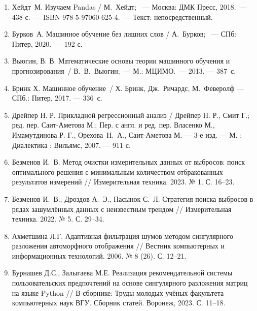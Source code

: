 \documentclass[a4paper,12pt]{article}
\begin{document}
\begin{enumerate}
	\item Хейдт М. Изучаем Pandas / М. Хейдт;  — Москва: ДМК Пресс, 2018. — 438 с. — ISBN 978-5-97060-625-4. — Текст: непосредственный.
	\item Бурков А. Машинное обучение без лишних слов / А. Бурков;  — СПб: Питер, 2020. — 192 с.
	\item Вьюгин, В. В. Математические основы теории машинного обучения и прогнозирования / В. В. Вьюгин; — М.: МЦИМО. — 2013. — 387~с.
	\item Бринк Х. Машинное обучение / Х. Бринк, Дж. Ричардс, М. Феверолф  — СПб.: Питер, 2017. — 336~с.
	\item Дрейпер Н. Р. Прикладной регрессионный анализ / Дрейпер Н. Р., Смит Г.; ред. пер. Саит-Аметова М.; Пер. с англ. и ред. пер. Власенко М., Имамутдинова Р. Г., Орехова Н. А., Саит-Аметова М. --- 3-е изд. --- М. : Диалектика : Вильямс, 2007. --- 911 с.
	\item Безменов И. В. Метод очистки измерительных данных от выбросов: поиск оптимального решения с минимальным количеством отбракованных результатов измерений // Измерительная техника. 2023. № 1. С. 16--23. 
	\item Безменов И. В., Дроздов А. Э., Пасынок С. Л. Стратегия поиска выбросов в рядах зашумлённых данных с неизвестным трендом // Измерительная техника. 2022. № 5. С. 29--34.
	\item Ахметшина Л.Г. Адаптивная фильтрация шумов методом сингулярного разложения автоморфного отображения // Вестник компьютерных и информационных технологий. 2006. № 8 (26). С. 12--21.
	\item Бурнашев Д.С., Залыгаева М.Е. Реализация рекомендательной системы пользовательских предпочтений на основе сингулярного разложения матриц на языке Python // В сборнике: Труды молодых учёных факультета компьютерных наук ВГУ. Сборник статей. Воронеж, 2023. С. 11--18.
\end{enumerate}
\end{document}
